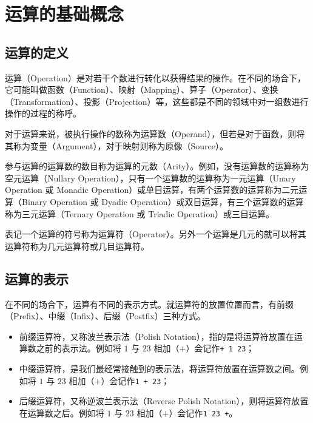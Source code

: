 \section{运算的基础概念}\label{sec:Calculations/OperationBasics}
    \subsection{运算的定义}\label{subsec:Calculations/OperationBasics/DefinitionOfOperation}
        运算（Operation）是对若干个数进行转化以获得结果的操作。在不同的场合下，它可能叫做函数（Function）、映射（Mapping）、算子（Operator）、变换（Transformation）、投影（Projection）等，这些都是不同的领域中对一组数进行操作的过程的称呼。

        对于运算来说，被执行操作的数称为运算数（Operand），但若是对于函数，则将其称为变量（Argument），对于映射则称为原像（Source）。

        参与运算的运算数的数目称为运算的元数（Arity）。例如，没有运算数的运算称为空元运算（Nullary Operation），只有一个运算数的运算称为一元运算（Unary Operation 或 Monadic Operation）或单目运算，有两个运算数的运算称为二元运算（Binary Operation 或 Dyadic Operation）或双目运算，有三个运算数的运算称为三元运算（Ternary Operation 或 Triadic Operation）或三目运算。

        表记一个运算的符号称为运算符（Operator）。另外一个运算是几元的就可以将其运算符称为几元运算符或几目运算符。

    \subsection{运算的表示}\label{subsec:Calculations/OperationBasics/PresentationOfOperation}
        在不同的场合下，运算有不同的表示方式。就运算符的放置位置而言，有前缀（Prefix）、中缀（Infix）、后缀（Postfix）三种方式。

        \begin{itemize}
            \item 前缀运算符，又称波兰表示法（Polish Notation），指的是将运算符放置在运算数之前的表示法。例如将 $1$ 与 $23$ 相加（$+$）会记作\texttt{+ 1 23}；
            \item 中缀运算符，是我们最经常接触到的表示法，将运算符放置在运算数之间。例如将 $1$ 与 $23$ 相加（$+$）会记作\texttt{1 + 23}；
            \item 后缀运算符，又称逆波兰表示法（Reverse Polish Notation），则将运算符放置在运算数之后。例如将 $1$ 与 $23$ 相加（$+$）会记作\texttt{1 23 +}。
        \end{itemize}
